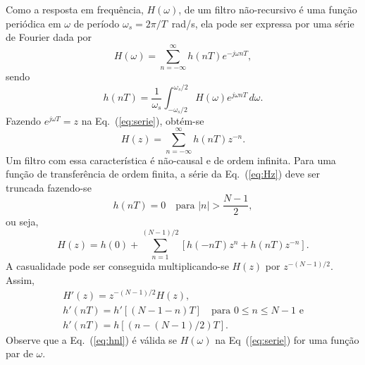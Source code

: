 \documentclass[12pt,addpoints]{exam}
\begin{document}
Como a resposta em frequência, $H(\omega)$, de um filtro não-recursivo é uma função periódica em $\omega$ de período $\omega_s = 2\pi/T$~rad/s, ela pode ser expressa por uma série de Fourier dada por
\begin{equation} \label{eq:serie}
    H(\omega) = \sum_{n=-\infty}^{\infty} h(nT) e^{-j\omega nT},
\end{equation}
sendo 
\begin{equation} \label{eq:hnt}
    h(nT) = \frac{1}{\omega_s} \int_{-\omega_s/2}^{\omega_s/2} H(\omega) e^{j\omega nT} \, d\omega.
\end{equation}
Fazendo $e^{j\omega T} = z$ na Eq.~(\ref{eq:serie}), obtém-se
\begin{equation} \label{eq:Hz}
    H(z) = \sum_{n=-\infty}^{\infty} h(nT) z^{-n}.
\end{equation}
Um filtro com essa característica é não-causal e de ordem infinita. Para uma função de transferência de ordem finita, a série da Eq.~(\ref{eq:Hz}) deve ser truncada fazendo-se
\begin{equation} \label{eq:hnt-finita}
    h(nT) = 0 \quad \text{para } |n| > \frac{N-1}{2},
\end{equation}
ou seja,
\begin{equation} \label{eq:Hz2}
    H(z) = h(0) + \sum_{n=1}^{(N-1)/2} \left[ h(-nT)z^n + h(nT)z^{-n} \right].
\end{equation}
A casualidade pode ser conseguida multiplicando-se $H(z)$ por $z^{-(N-1)/2}$. Assim,
\begin{gather} 
    H'(z) = z^{-(N-1)/2}H(z), \label{eq:hzl} \\
    h'(nT) = h'[(N-1-n)T] \quad \text{para } 0 \le n \le N-1 \text{ e} \label{eq:hnl} \\
    h'(nT) = h[(n - (N-1)/2)T]. \label{eq:hnl1}
\end{gather}
Observe que a Eq.~(\ref{eq:hnl}) é válida se $H(\omega)$ na Eq~(\ref{eq:serie}) for uma função par de $\omega$.
\end{document}
